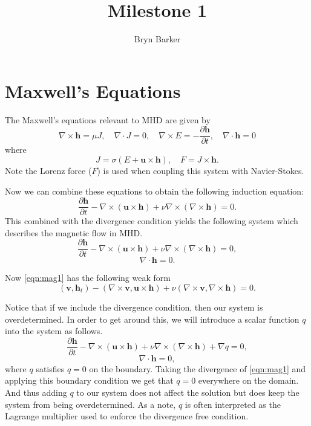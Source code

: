 \documentclass{article}
\begin{document}
\title{Milestone 1}
\author{Bryn Barker}

\maketitle

\section*{Maxwell's Equations}
The Maxwell's equations relevant to MHD are given by
\[\nabla \times \boldsymbol{h} = \mu J,\quad \nabla \cdot J=0,\quad \nabla \times E = -\frac{\partial \boldsymbol{h} }{\partial t},\quad \nabla \cdot \boldsymbol{h} = 0\]
where \[ J = \sigma (E + \boldsymbol{u}\times \boldsymbol{h}),\quad F = J\times \boldsymbol{h}.\]
Note the Lorenz force ($F$) is used when coupling this system with Navier-Stokes.

Now we can combine these equations to obtain the following induction equation:
\[
    \frac{\partial \boldsymbol{h} }{\partial t} - \nabla \times (\boldsymbol{u}\times \boldsymbol{h}) + \nu \nabla \times (\nabla \times \boldsymbol{h}) = 0.
\]
This combined with the divergence condition yields the following system which describes the magnetic flow in MHD.
\begin{equation}\label{eqn:mag1}
    \frac{\partial \boldsymbol{h} }{\partial t} - \nabla \times (\boldsymbol{u}\times \boldsymbol{h}) + \nu \nabla \times (\nabla \times \boldsymbol{h}) = 0,
\end{equation}
\begin{equation}\label{eqn:mag2}
    \nabla \cdot \boldsymbol{h} = 0.
\end{equation}

Now \eqref{eqn:mag1} has the following weak form
\begin{equation}\label{eqn:mag1weak}
    (\boldsymbol{v}, \boldsymbol{h}_t)-(\nabla \times \boldsymbol{v},\boldsymbol{u}\times \boldsymbol{h}) + \nu (\nabla \times \boldsymbol{v},\nabla \times \boldsymbol{h}) = 0.
\end{equation}

Notice that if we include the divergence condition, then our system is overdetermined. In order to get around this, we will introduce a scalar function $q$ into the system as follows. 
\begin{equation}\label{eqn:mag1}
    \frac{\partial \boldsymbol{h} }{\partial t} - \nabla \times (\boldsymbol{u}\times \boldsymbol{h}) + \nu \nabla \times (\nabla \times \boldsymbol{h}) + \nabla q= 0,
\end{equation}
\begin{equation}\label{eqn:mag2}
    \nabla \cdot \boldsymbol{h} = 0,
\end{equation}
where $q$ satisfies $q = 0$ on the boundary. Taking the divergence of \eqref{eqn:mag1} and applying this boundary condition we get that $q=0$ everywhere on the domain. And thus adding $q$ to our system does not affect the solution but does keep the system from being overdetermined. As a note, $q$ is often interpreted as the Lagrange multiplier used to enforce the divergence free condition. 
\end{document}
